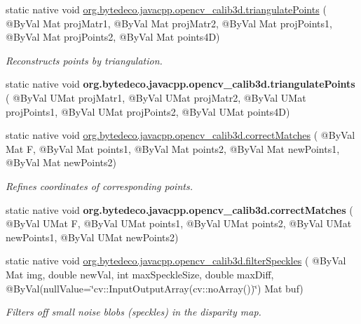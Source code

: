 \begin{DoxyCompactItemize}
\item 
static native void \hyperlink{group__calib3d_ga12a47c5bb55266df7219c8f3e385f156}{org.\+bytedeco.\+javacpp.\+opencv\+\_\+calib3d.\+triangulate\+Points} ( @By\+Val Mat proj\+Matr1, @By\+Val Mat proj\+Matr2, @By\+Val Mat proj\+Points1, @By\+Val Mat proj\+Points2, @By\+Val Mat points4D)
\begin{DoxyCompactList}\small\item\em Reconstructs points by triangulation. \end{DoxyCompactList}\item 
\mbox{\label{group__calib3d_ga19e6ec08908075e982178c017ce6ed42}} 
static native void {\bfseries org.\+bytedeco.\+javacpp.\+opencv\+\_\+calib3d.\+triangulate\+Points} ( @By\+Val U\+Mat proj\+Matr1, @By\+Val U\+Mat proj\+Matr2, @By\+Val U\+Mat proj\+Points1, @By\+Val U\+Mat proj\+Points2, @By\+Val U\+Mat points4D)
\item 
static native void \hyperlink{group__calib3d_gad0d4f7daee2c8fda384311c1bce0965a}{org.\+bytedeco.\+javacpp.\+opencv\+\_\+calib3d.\+correct\+Matches} ( @By\+Val Mat F, @By\+Val Mat points1, @By\+Val Mat points2, @By\+Val Mat new\+Points1, @By\+Val Mat new\+Points2)
\begin{DoxyCompactList}\small\item\em Refines coordinates of corresponding points. \end{DoxyCompactList}\item 
\mbox{\label{group__calib3d_gac18b15689a8e6ca9d5681bd1d803d6b4}} 
static native void {\bfseries org.\+bytedeco.\+javacpp.\+opencv\+\_\+calib3d.\+correct\+Matches} ( @By\+Val U\+Mat F, @By\+Val U\+Mat points1, @By\+Val U\+Mat points2, @By\+Val U\+Mat new\+Points1, @By\+Val U\+Mat new\+Points2)
\item 
static native void \hyperlink{group__calib3d_ga18894b69acb224417c0f0a1afaded536}{org.\+bytedeco.\+javacpp.\+opencv\+\_\+calib3d.\+filter\+Speckles} ( @By\+Val Mat img, double new\+Val, int max\+Speckle\+Size, double max\+Diff, @By\+Val(null\+Value=\char`\"{}cv\+::\+Input\+Output\+Array(cv\+::no\+Array())\char`\"{}) Mat buf)
\begin{DoxyCompactList}\small\item\em Filters off small noise blobs (speckles) in the disparity map. \end{DoxyCompactList}\item 
\mbox{\label{group__calib3d_gae09c1f0ffbdf8776ac0740fec6bfe9be}} 

\end{DoxyCompactItemize}
